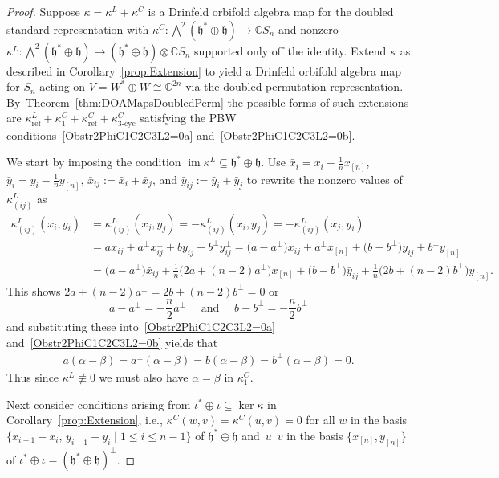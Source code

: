 \documentclass[pdftex]{sigma}
\numberwithin{equation}{section}
\DeclareMathOperator{\im}{im}
\DeclareMathOperator{\refl}{ref}
\DeclareMathOperator{\tri}{3-cyc}
\begin{document}
\begin{proof}Suppose $\kappa=\kappa^L+\kappa^C$ is a Drinfeld orbifold algebra map for the doubled
standard representation with $\kappa^C\colon \bigwedge^2 (\mathfrak{h}^*\oplus\mathfrak{h}) \to \mathbb{C} S_n$ and
nonzero $\kappa^L\colon \bigwedge^2 (\mathfrak{h}^*\oplus\mathfrak{h}) \to (\mathfrak{h}^*\oplus\mathfrak{h}) \otimes \mathbb{C} S_n$ supported
only off the identity. Extend $\kappa$ as described in Corollary~\ref{prop:Extension}
to yield a Drinfeld orbifold algebra map for $S_n$ acting on $V=W^* \oplus W \cong \mathbb{C}^{2n}$
via the doubled permutation representation. By~Theorem~\ref{thm:DOAMapsDoubledPerm} the
possible forms of such extensions are
$\kappa^L_{\refl}+\kappa^C_1+\kappa^C_{\refl}+\kappa^C_{\tri}$
satisfying the PBW conditions~\eqref{Obstr2PhiC1C2C3L2=0a} and~\eqref{Obstr2PhiC1C2C3L2=0b}.

We start by imposing the condition $\im \kappa^L \subseteq \mathfrak{h}^*\oplus\mathfrak{h}$.
Use $\bar{x}_i=x_i-\tfrac{1}{n}x_{[n]}$, $\bar{y}_i=y_i-\tfrac{1}{n}y_{[n]}$,
$\bar{x}_{ij}:=\bar{x}_i+\bar{x}_j$, and $\bar{y}_{ij}:=\bar{y}_i+\bar{y}_j$ to
rewrite the nonzero values of $\kappa^L_{(ij)}$ as
\begin{align*}
\kappa^L_{(ij)}(x_i,y_i)&=\kappa^L_{(ij)}(x_j,y_j)=-\kappa^L_{(ij)}(x_i,y_j)=-\kappa^L_{(ij)}(x_j,y_i) \\
&=ax_{ij}+a^\perp x_{ij}^\perp + by_{ij}+b^\perp y_{ij}^\perp
=\big(a-a^\perp\big)x_{ij}+a^\perp x_{[n]}+\big(b-b^\perp\big)y_{ij}+b^\perp y_{[n]}
\\
&=\big(a\!-a^\perp\big)\bar{x}_{ij}\!+\frac{1}{n}\big(2a+(n\!-2)a^\perp\big) x_{[n]}\!+\big(b\!-b^\perp\big)\bar{y}_{ij}\!+\frac{1}{n}\big(2b+(n\!-2)b^\perp\big) y_{[n]}.
\end{align*}
This shows
$2a+(n-2)a^\perp=2b+(n-2)b^\perp=0$ or
\begin{equation}
\label{arelatedtoaperp}
a-a^\perp=-\frac{n}{2}a^\perp \quad \text{ and } \quad b-b^\perp=-\frac{n}{2}b^\perp
\end{equation}
and substituting these into~\eqref{Obstr2PhiC1C2C3L2=0a}
and~\eqref{Obstr2PhiC1C2C3L2=0b} yields that{\samepage
\begin{gather*}
a(\alpha-\beta)=a^\perp(\alpha-\beta)=b(\alpha-\beta)=b^\perp(\alpha-\beta)=0.
\end{gather*}
Thus since $\kappa^L \not \equiv 0$ we must also have $\alpha=\beta$ in $\kappa^C_1$.}

Next consider conditions arising from $\iota^*\oplus\iota\subseteq\ker\kappa$ in
Corollary~\ref{prop:Extension}, i.e., $\kappa^C(w,v)=\kappa^C(u,v)=0$
for all $w$ in the basis $\{x_{i+1}-x_i,\, y_{i+1}-y_i \mid 1 \leq i \leq n-1 \}$
of $\mathfrak{h}^*\oplus\mathfrak{h}$ and~$u$~$v$ in the basis $\{x_{[n]},y_{[n]}\}$
of $\iota^* \oplus \iota=(\mathfrak{h}^*\oplus\mathfrak{h})^\perp$.


\end{proof}
\end{document}
